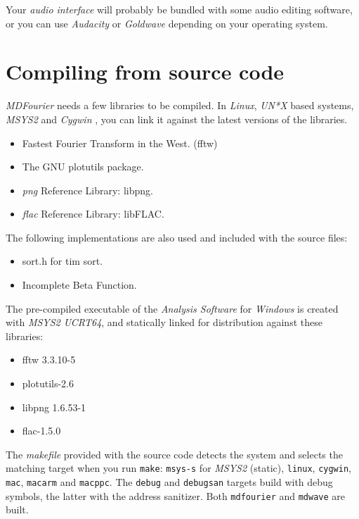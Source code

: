 \documentclass[10pt,a4paper]{report}
\newcommand{\ac}[1]{\textit{\mbox{\acrshort{#1}}}}
\begin{document}
\begin{appendices}
Your \textit{audio interface} will probably be bundled with some audio editing software, or you can use \textit{Audacity} \cite{audacity} or \textit{Goldwave} \cite{goldwave} depending on your operating system.

\chapter{Compiling from source code}
\label{compiling}

\textit{MDFourier} needs a few libraries to be compiled. In \textit{Linux}, \textit{UN*X} based systems, \textit{MSYS2} \cite{msys2} and \textit{Cygwin} \cite{cygwin}, you can link it against the latest versions of the libraries.

\begin{itemize}
	\item Fastest Fourier Transform in the West. (fftw) \cite{fftw}
	\item The GNU plotutils package. \cite{libplot}
	\item \ac{png} Reference Library: libpng. \cite{libpng}
	\item \ac{flac} Reference Library: libFLAC. \cite{libflac}
\end{itemize}

The following implementations are also used and included with the source files:

\begin{itemize}
	\item sort.h for tim sort. \cite{sort}
	\item Incomplete Beta Function. \cite{betafunction}
\end{itemize}

The pre-compiled executable of the \textit{Analysis Software} for \textit{Windows} is created with \textit{MSYS2 UCRT64}, and statically linked for distribution against these libraries:

\begin{itemize}
	\item fftw 3.3.10-5 \cite{fftw}
	\item plotutils-2.6 \cite{libplot}
	\item libpng 1.6.53-1 \cite{libpng}
	\item flac-1.5.0 \cite{libflac}
\end{itemize}

The \textit{makefile} provided with the source code \cite{sourcecode} detects the system and selects the matching target when you run \texttt{make}: \texttt{msys-s} for \textit{MSYS2} (static), \texttt{linux}, \texttt{cygwin}, \texttt{mac}, \texttt{macarm} and \texttt{macppc}. The \texttt{debug} and \texttt{debugsan} targets build with debug symbols, the latter with the address sanitizer. Both \texttt{mdfourier} and \texttt{mdwave} are built.


\end{appendices}
\end{document}
